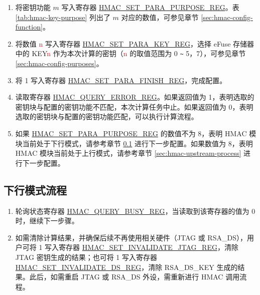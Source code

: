 \documentclass[main\_\_CN.tex]{subfiles}
\begin{document}
        \begin{enumerate}
            \item 将密钥功能 \begin{math}m\end{math} 写入寄存器 \hyperref[regdesc:HMACSETPARAPURPOSEREG]{HMAC\_SET\_PARA\_PURPOSE\_REG}。表 \ref{tab:hmac-key-purpose} 列出了 \begin{math}m\end{math} 对应的数值，可参见章节 \ref{sec:hmac-config-function}。
            \item 将数值 \textcolor{red}{n} 写入寄存器 \hyperref[regdesc:HMACSETPARAKEYREG]{HMAC\_SET\_PARA\_KEY\_REG}，选择 eFuse 存储器中的 KEY\textcolor{red}{n} 作为本次计算的密钥（\textcolor{red}{n} 的取值范围为 0 \verb+~+ 5，7），可参见章节 \ref{sec:hmac-config-purposes}。
            \item 将 1 写入寄存器 \hyperref[regdesc:HMACSETPARAFINISHREG]{HMAC\_SET\_PARA\_FINISH\_REG}，完成配置。
            \item 读取寄存器 \hyperref[regdesc:HMACQUERYERRORREG]{HMAC\_QUERY\_ERROR\_REG}。如果返回值为 1，表明选取的密钥块与配置的密钥功能不匹配，本次计算任务中止。如果返回值为 0，表明选取的密钥块与配置的密钥功能匹配，可以执行计算流程。
            \item 如果 \hyperref[regdesc:HMACSETPARAPURPOSEREG]{HMAC\_SET\_PARA\_PURPOSE\_REG} 的数值不为 8，表明 HMAC 模块当前处于下行模式，请参考章节 \ref{sec:hmac-downstream-process} 进行下一步配置。如果数值为 8，表明 HMAC 模块当前处于上行模式，请参考章节 \ref{sec:hmac-upstream-process} 进行下一步配置。
        \end{enumerate}

\subsection{下行模式流程}
\label{sec:hmac-downstream-process}

        \begin{enumerate}
            \item 轮询状态寄存器 \hyperref[regdesc:HMACQUERYBUSYREG]{HMAC\_QUERY\_BUSY\_REG}，当读取到该寄存器的值为 0 时，继续下一步骤。
            \item 如需清除计算结果，并确保后续不再使用相关硬件（JTAG 或 RSA\_DS），用户可将 1 写入寄存器 \hyperref[regdesc:HMACSETINVALIDATEJTAGREG]{HMAC\_SET\_INVALIDATE\_JTAG\_REG}，清除 JTAG 密钥生成的结果；也可将 1 写入寄存器 \hyperref[regdesc:HMACSETINVALIDATEDSREG]{HMAC\_SET\_INVALIDATE\_DS\_REG}，清除 RSA\_DS\_KEY 生成的结果。此后，如需重启 JTAG 或 RSA\_DS 外设，需重新进行 HMAC 调用流程。
        \end{enumerate}
\end{document}
